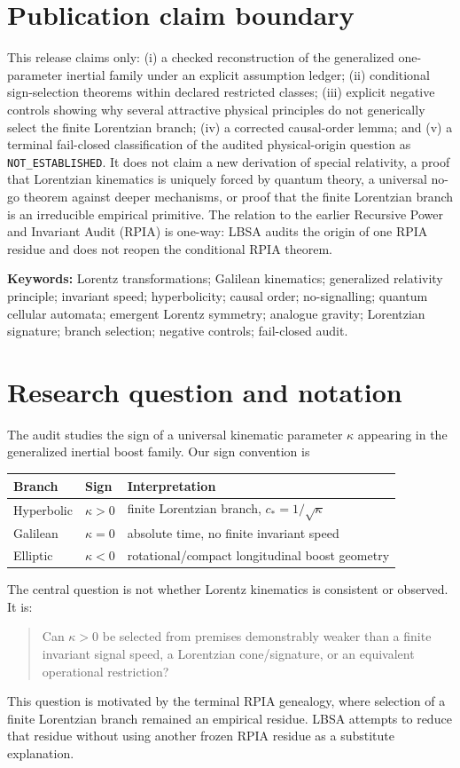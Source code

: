 \documentclass[11pt,a4paper]{article}
\newcommand{\kap}{\kappa}
\newcommand{\cstar}{c_{\!*}}
\newcommand{\status}[1]{\texttt{#1}}
\begin{document}
\section*{Publication claim boundary}
This release claims only: (i) a checked reconstruction of the generalized one-parameter inertial family under an explicit assumption ledger; (ii) conditional sign-selection theorems within declared restricted classes; (iii) explicit negative controls showing why several attractive physical principles do not generically select the finite Lorentzian branch; (iv) a corrected causal-order lemma; and (v) a terminal fail-closed classification of the audited physical-origin question as \status{NOT\_ESTABLISHED}.  It does not claim a new derivation of special relativity, a proof that Lorentzian kinematics is uniquely forced by quantum theory, a universal no-go theorem against deeper mechanisms, or proof that the finite Lorentzian branch is an irreducible empirical primitive.  The relation to the earlier Recursive Power and Invariant Audit (RPIA) is one-way: LBSA audits the origin of one RPIA residue and does not reopen the conditional RPIA theorem.

\noindent\textbf{Keywords:} Lorentz transformations; Galilean kinematics; generalized relativity principle; invariant speed; hyperbolicity; causal order; no-signalling; quantum cellular automata; emergent Lorentz symmetry; analogue gravity; Lorentzian signature; branch selection; negative controls; fail-closed audit.

\section{Research question and notation}
The audit studies the sign of a universal kinematic parameter $\kap$ appearing in the generalized inertial boost family.  Our sign convention is
\begin{center}
\begin{tabular}{lll}
\toprule
Branch & Sign & Interpretation \\
\midrule
Hyperbolic & $\kap>0$ & finite Lorentzian branch, $\cstar=1/\sqrt{\kap}$ \\
Galilean & $\kap=0$ & absolute time, no finite invariant speed \\
Elliptic & $\kap<0$ & rotational/compact longitudinal boost geometry \\
\bottomrule
\end{tabular}
\end{center}
The central question is not whether Lorentz kinematics is consistent or observed.  It is:
\begin{quote}
Can $\kap>0$ be selected from premises demonstrably weaker than a finite invariant signal speed, a Lorentzian cone/signature, or an equivalent operational restriction?
\end{quote}
This question is motivated by the terminal RPIA genealogy, where selection of a finite Lorentzian branch remained an empirical residue.  LBSA attempts to reduce that residue without using another frozen RPIA residue as a substitute explanation.
\end{document}

